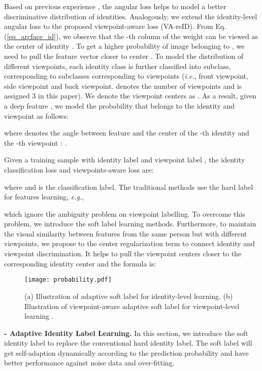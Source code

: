 \documentclass[letterpaper]{article} \usepackage{aaai20}  \usepackage{times}  \usepackage{helvet} \usepackage{courier}  \usepackage[hyphens]{url}  \usepackage{graphicx} \usepackage{array}
\begin{document}
Based on previous experience \cite{Liu2017SphereFaceDH,Deng_2019_CVPR}, the angular loss helps to model a better discriminative distribution of identities. Analogously, we extend the identity-level angular loss to the proposed viewpoint-aware loss (VA-reID). From Eq.(\ref{eq_arcface_id}), we observe that the -th column of the weight  can be viewed as the center of identity . To get a higher probability of image  belonging to , we need to pull the feature vector  closer to center . To model the distribution of different viewpoints, each identity class is further classified into  subclass, corresponding to  subclasses corresponding to  viewpoints (\textit{i.e.}, front viewpoint, side viewpoint and back viewpoint.  denotes the number of viewpoints and is assigned 3 in this paper). We denote the viewpoint centers as . As a result, given a deep feature , we model the probability that  belongs to the identity  and viewpoint  as follows:

where  denotes the angle between feature  and the center of the -th identity and the -th viewpoint : .

 
Given a training sample  with identity label  and viewpoint label , the identity classification loss  and viewpoints-aware loss  are:



where  and  is the classification label. The traditional methods use the hard label for features learning, \textit{e.g.},



which ignore the ambiguity problem on viewpoint labelling. To overcome this problem, we introduce the soft label learning methods. Furthermore, to maintain the visual similarity between features from the same person but with different viewpoints,  we propose to the center regularization term to connect identity and viewpoint discrimination. It helps to pull the  viewpoint centers  closer to the corresponding identity center and the formula is:



\begin{figure}[t]
\centering
\texttt{[image: probability.pdf]} 
\caption{(a) Illustration of adaptive soft label for identity-level learning. (b) Illustration of viewpoint-aware adaptive soft label for viewpoint-level learning .}
\label{fig:prob}
\end{figure}



\noindent \textbf{ - Adaptive Identity Label Learning.}
In this section, we introduce the soft identity label to replace the conventional hard identity label. The soft label will get self-adaption dynamically according to the prediction probability and have better performance against noise data and over-fitting.
\end{document}
